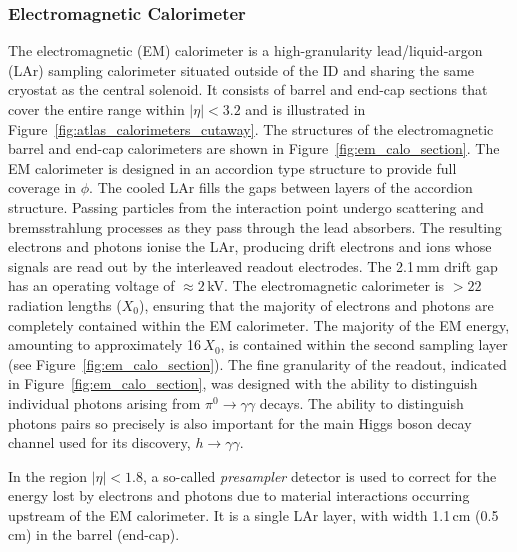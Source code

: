 \subsubsection{Electromagnetic Calorimeter}
\label{sec:calo_em}

The electromagnetic (EM) calorimeter is a high-granularity lead/liquid-argon (LAr)
sampling calorimeter situated outside of the ID and sharing the
same cryostat as the central solenoid.
It consists of barrel and end-cap sections that cover the entire
range within $\lvert \eta \rvert < 3.2$ and is illustrated in Figure~\ref{fig:atlas_calorimeters_cutaway}.
The structures of the electromagnetic barrel and end-cap calorimeters
are shown in Figure~\ref{fig:em_calo_section}.
The EM calorimeter is designed in an accordion type structure to provide full coverage
in $\phi$.
The cooled LAr fills the gaps between layers of the
accordion structure.
Passing particles from the interaction point undergo scattering and bremsstrahlung processes as they pass through
the lead absorbers. The resulting electrons and photons ionise the LAr, producing
drift electrons and ions whose signals are read out by the interleaved readout
electrodes. The 2.1\,mm drift gap has an operating voltage of $\approx 2$\,kV.
The electromagnetic calorimeter is $>22$ radiation lengths ($X_0$), ensuring
that the majority of electrons and photons are completely contained within the EM calorimeter.
The majority of the EM energy, amounting to approximately 16\,$X_0$, is contained
within the second sampling layer (see Figure~\ref{fig:em_calo_section}).
The fine granularity of the readout, indicated in Figure~\ref{fig:em_calo_section},
was designed with the ability to distinguish individual photons arising from $\pi^0 \rightarrow \gamma \gamma$
decays. The ability to distinguish photons pairs so precisely is also important for the
main Higgs boson decay channel used for its discovery, $h \rightarrow \gamma \gamma$.

In the region $\lvert \eta \rvert < 1.8$, a so-called \textit{presampler} detector is used to correct
for the energy lost by electrons and photons due to material interactions occurring
upstream of the EM calorimeter.
It is a single LAr layer, with width 1.1\,cm (0.5\,cm) in the barrel (end-cap).

